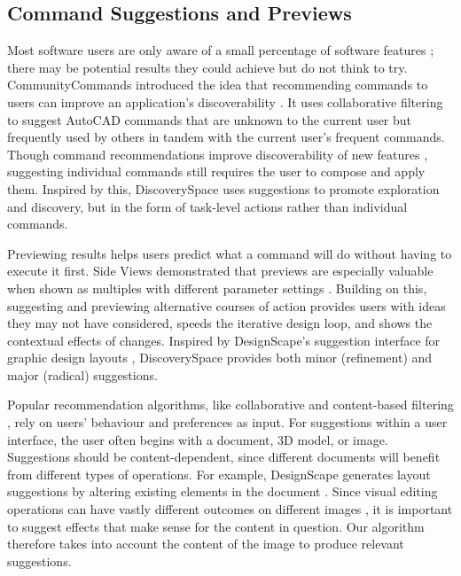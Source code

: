 \subsection{Command Suggestions and Previews}
Most software users are only aware of a small percentage of software features \cite{MM-gi2000}; there may be potential results they could achieve but do not think to try. CommunityCommands introduced the idea that recommending commands to users can improve an application's discoverability \cite{Li2011, Matejka2009}. It uses collaborative filtering to suggest AutoCAD commands that are unknown to the current user but frequently used by others in tandem with the current user's frequent commands. Though command recommendations improve discoverability of new features \cite{Li2011}, suggesting individual commands still requires the user to compose and apply them. Inspired by this, Discovery\-Space uses suggestions to promote exploration and discovery, but in the form of task-level actions rather than individual commands. 

Previewing results helps users predict what a command will do without having to execute it first. Side Views demonstrated that previews are especially valuable when shown as multiples with different parameter settings \cite{Terry2002}. Building on this, suggesting and previewing alternative courses of action provides users with ideas they may not have considered, speeds the iterative design loop, and shows the contextual effects of changes. Inspired by DesignScape's suggestion interface for graphic design layouts \cite{ODonovan2015}, Discovery\-Space provides both minor (refinement) and major (radical) suggestions.

Popular recommendation algorithms, like collaborative and content-based filtering \cite{Pazzani2007}, rely on users' behaviour and preferences as input. For suggestions within a user interface, the user often begins with a document, 3D model, or image. Suggestions should be content-dependent, since different documents will benefit from different types of operations. For example, DesignScape generates layout suggestions by altering existing elements in the document \cite{ODonovan2015}. Since visual editing operations can have vastly different outcomes on different images \cite{Berthouzoz2011}, it is important to suggest effects that make sense for the content in question. Our algorithm therefore takes into account the content of the image to produce relevant suggestions.

